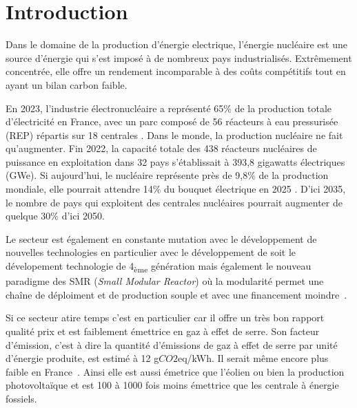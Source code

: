 \section{Introduction}

Dans le domaine de la production d'énergie electrique, l'énergie nucléaire est une source d'énergie qui s'est imposé à de nombreux pays industrialisés. Extrêmement concentrée, elle offre un rendement incomparable à des coûts compétitifs tout en ayant un bilan carbon faible.

En 2023, l'industrie électronucléaire a représenté 65\% de la production totale d'électricité en France, avec un parc composé de 56 réacteurs à eau pressurisée (REP) répartis sur 18 centrales \cite{rte2023}. Dans le monde, la production nucléaire ne fait qu'augmenter. Fin 2022, la capacité totale des 438 réacteurs nucléaires de puissance en exploitation dans 32 pays s’établissait à 393,8 gigawatts électriques (GWe). Si aujourd'hui, le nucléaire représente près de 9,8\% de la production mondiale, elle pourrait attendre 14\% du bouquet électrique en 2025 \cite{aiea2023}. D'ici 2035, le nombre de pays qui exploitent des centrales nucléaires pourrait augmenter de quelque 30\% d'ici 2050.

Le secteur est également en constante mutation avec le développement de nouvelles technologies en particulier avec le développement de soit le dévelopement technologie de 4\textsubscript{ème} génération mais également le nouveau paradigme des SMR (\textit{Small Modular Reactor}) où la modularité permet une chaîne de déploiment et de production souple et avec une financement moindre~\cite{academie2022}.

Si ce secteur atire temps c'est en particulier car il offre un très bon rapport qualité prix et est faiblement émettrice en gaz à effet de serre. Son facteur d'émission, c'est à dire la quantité d'émissions de gaz à effet de serre par unité d'énergie produite, est estimé à 12 g$CO2$eq/kWh. Il serait même encore plus faible en France~\cite{schlomer_technology-specific_nodate}. Ainsi elle est aussi émetrice que l'éolien ou bien la production photovoltaïque et est 100 à 1000 fois moins émettrice que les centrale à énergie fossiels.

